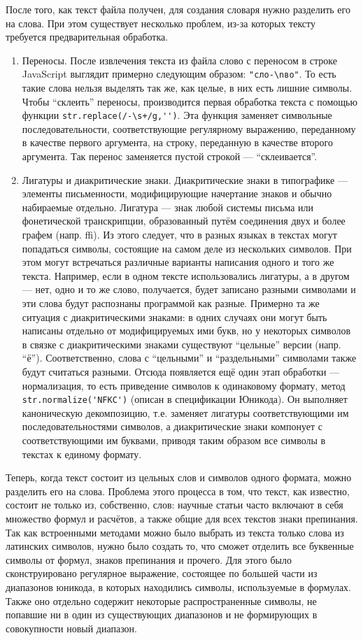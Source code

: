 \documentclass[a4paper,openbib]{report}
\begin{document}
После того, как текст файла получен, для создания словаря нужно разделить его на слова. При этом существует несколько проблем, из-за которых тексту требуется 
предварительная обработка.
\begin{enumerate}
\item
 Переносы.
 После извлечения текста из файла слово с переносом в строке JavaScript выглядит примерно следующим образом: \verb|"сло-\nво"|. То есть такие слова нельзя выделять 
 так же, как целые, в них есть лишние символы. Чтобы ``склеить'' переносы, производится первая обработка текста с помощью функции \verb|str.replace(/-\s+/g,'')|. 
 Эта функция заменяет символьные последовательности, соответствующие регулярному выражению, переданному в качестве первого аргумента, на строку, переданную в 
 качестве второго аргумента. Так перенос заменяется пустой строкой --- ``склеивается''.
\item
 Лигатуры и диакритические знаки.
 Диакритические знаки в типографике --- элементы письменности, модифицирующие начертание знаков и обычно набираемые отдельно.
 Лигатура --- знак любой системы письма или фонетической транскрипции, образованный путём соединения двух и более графем (напр. ffi).
 Из этого следует, что в разных языках в текстах могут попадаться символы, состоящие на самом деле из нескольких символов. При этом могут встречаться различные 
 варианты написания одного и того же текста. Например, если в одном тексте использовались лигатуры, а в другом --- нет, одно и то же слово, получается, будет записано 
 разными символами и эти слова будут распознаны программой как разные. Примерно та же ситуация с диакритическими знаками: в одних случаях они могут быть написаны 
 отдельно от модифицируемых ими букв, но у некоторых символов в связке с диакритическими знаками существуют ``цельные'' версии (напр. ``ё''). Соответственно, 
 слова с ``цельными'' и ``раздельными'' символами также будут считаться разными.
 Отсюда появляется ещё один этап обработки --- нормализация, то есть приведение символов к одинаковому формату, метод \verb|str.normalize('NFKC')| (описан в спецификации Юникода). 
 Он выполняет каноническую декомпозицию, т.е. заменяет лигатуры соответствующими им последовательностями символов, а диакритические знаки компонует с соответствующими 
 им буквами, приводя таким образом все символы в текстах к единому формату.
\end{enumerate}
 Теперь, когда текст состоит из цельных слов и символов одного формата, можно разделить его на слова. Проблема этого процесса в том, что текст, как известно, состоит 
не только из, собственно, слов: научные статьи часто включают в себя множество формул и расчётов, а также общие для всех текстов знаки препинания. Так как встроенными 
методами можно было выбрать из текста только слова из латинских символов, нужно было создать то, что сможет отделить все буквенные символы от формул, знаков препинания 
и прочего. Для этого было сконструировано регулярное выражение, состоящее по большей части из диапазонов юникода, в которых находились символы, используемые в формулах. 
Также оно отдельно содержит некоторые распространенные символы, не попавшие ни в один из существующих диапазонов и не формирующих в совокупности новый диапазон.
\end{document}
